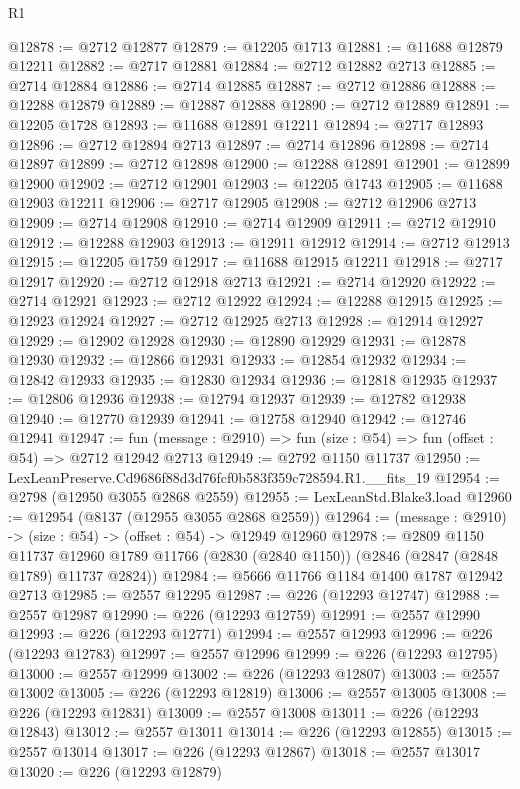 \begin{lexlean}{R1}
\begin{coremodule}
@12878 := @2712 @12877
@12879 := @12205 @1713
@12881 := @11688 @12879 @12211
@12882 := @2717 @12881
@12884 := @2712 @12882 @2713
@12885 := @2714 @12884
@12886 := @2714 @12885
@12887 := @2712 @12886
@12888 := @12288 @12879
@12889 := @12887 @12888
@12890 := @2712 @12889
@12891 := @12205 @1728
@12893 := @11688 @12891 @12211
@12894 := @2717 @12893
@12896 := @2712 @12894 @2713
@12897 := @2714 @12896
@12898 := @2714 @12897
@12899 := @2712 @12898
@12900 := @12288 @12891
@12901 := @12899 @12900
@12902 := @2712 @12901
@12903 := @12205 @1743
@12905 := @11688 @12903 @12211
@12906 := @2717 @12905
@12908 := @2712 @12906 @2713
@12909 := @2714 @12908
@12910 := @2714 @12909
@12911 := @2712 @12910
@12912 := @12288 @12903
@12913 := @12911 @12912
@12914 := @2712 @12913
@12915 := @12205 @1759
@12917 := @11688 @12915 @12211
@12918 := @2717 @12917
@12920 := @2712 @12918 @2713
@12921 := @2714 @12920
@12922 := @2714 @12921
@12923 := @2712 @12922
@12924 := @12288 @12915
@12925 := @12923 @12924
@12927 := @2712 @12925 @2713
@12928 := @12914 @12927
@12929 := @12902 @12928
@12930 := @12890 @12929
@12931 := @12878 @12930
@12932 := @12866 @12931
@12933 := @12854 @12932
@12934 := @12842 @12933
@12935 := @12830 @12934
@12936 := @12818 @12935
@12937 := @12806 @12936
@12938 := @12794 @12937
@12939 := @12782 @12938
@12940 := @12770 @12939
@12941 := @12758 @12940
@12942 := @12746 @12941
@12947 := fun (message : @2910) => fun (size : @54) => fun (offset : @54) => @2712 @12942 @2713
@12949 := @2792 @1150 @11737
@12950 := LexLeanPreserve.Cd9686f88d3d76fcf0b583f359c728594.R1.__fits_19
@12954 := @2798 (@12950 @3055 @2868 @2559)
@12955 := LexLeanStd.Blake3.load
@12960 := @12954 (@8137 (@12955 @3055 @2868 @2559))
@12964 := (message : @2910) -> (size : @54) -> (offset : @54) -> @12949 @12960
@12978 := @2809
    @1150
    @11737
    @12960
    @1789
    @11766
    (@2830 (@2840 @1150))
    (@2846 (@2847 (@2848 @1789) @11737 @2824))
@12984 := @5666 @11766 @1184 @1400 @1787 @12942 @2713
@12985 := @2557 @12295
@12987 := @226 (@12293 @12747)
@12988 := @2557 @12987
@12990 := @226 (@12293 @12759)
@12991 := @2557 @12990
@12993 := @226 (@12293 @12771)
@12994 := @2557 @12993
@12996 := @226 (@12293 @12783)
@12997 := @2557 @12996
@12999 := @226 (@12293 @12795)
@13000 := @2557 @12999
@13002 := @226 (@12293 @12807)
@13003 := @2557 @13002
@13005 := @226 (@12293 @12819)
@13006 := @2557 @13005
@13008 := @226 (@12293 @12831)
@13009 := @2557 @13008
@13011 := @226 (@12293 @12843)
@13012 := @2557 @13011
@13014 := @226 (@12293 @12855)
@13015 := @2557 @13014
@13017 := @226 (@12293 @12867)
@13018 := @2557 @13017
@13020 := @226 (@12293 @12879)

\end{coremodule}
\end{lexlean}
